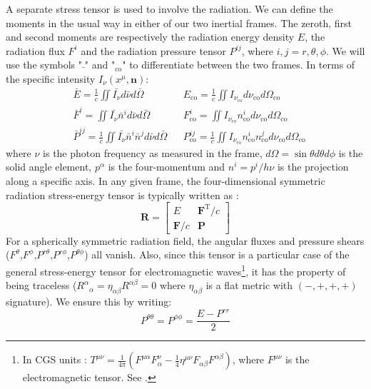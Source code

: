 \documentclass[../main.tex]{subfiles}
\begin{document}
A separate stress tensor is used to involve the radiation. We can define the moments in the usual way in either of our two inertial frames. The zeroth, first and second moments are respectively the radiation energy density $E$, the radiation flux $F^i$ and the radiation pressure tensor $P^{ij}$, where $i,j=r,\theta,\phi$.  We will use the symbols "$\bar{\;}$" and "$_\text{co}$" to differentiate between the two frames.  In terms of the specific intensity $I_\nu(x^\mu,\bm{n})$:
\begin{align}
    &\bar{E}=\frac{1}{c}\iint \bar{I_\nu}d\bar{\nu}d\bar{\Omega}&& E_\text{co}=\frac{1}{c}\iint I_{\nu_\text{co}}d\nu_\text{co}d\Omega_\text{co}\nonumber\\
    &\bar{F}^i=\iint \bar{I_\nu}\bar{n}^id\bar{\nu}d\bar{\Omega}&& F^i_\text{co}=\iint I_{\nu_\text{co}}n^i_\text{co}d\nu_\text{co}d\Omega_\text{co}\nonumber\\
    &\bar{P}^{ij}=\frac{1}{c}\iint \bar{I_\nu}\bar{n}^i\bar{n}^jd\bar{\nu}d\bar{\Omega}&& P^{ij}_\text{co}=\frac{1}{c}\iint I_{\nu_\text{co}}n^i_\text{co}n^j_\text{co}d\nu_\text{co}d\Omega_\text{co}
\end{align}
where $\nu$ is the photon frequency as measured in the frame, $d\Omega=\sin\theta d\theta d\phi$ is the solid angle element, $p^\alpha$ is the four-momentum and $n^i=p^i/h\nu$ is the projection along a specific axis.  In any given frame, the four-dimensional symmetric radiation stress-energy tensor is typically written as \citep{MihalasMihalas1984}:
$$\bm{R}=\begin{bmatrix}E&\bm{F}^\text{T}/c\\\bm{F}/c&\bm{P}\end{bmatrix}$$
For a spherically symmetric radiation field, the angular fluxes and pressure shears ($F^\theta$,$F^\phi$,$P^{r\theta}$,$P^{r\phi}$,$P^{\theta\phi}$) all vanish.  Also, since this tensor is a particular case of the general stress-energy tensor for electromagnetic waves\footnote{In CGS units : $T^{\mu\nu}=
\frac{1}{4\pi}\left(F^{\mu\alpha}F^\nu_\alpha-\frac{1}{4}\eta^{\mu\nu}F_{\alpha\beta}F^{\alpha\beta}\right)$, where $F^{\mu\nu}$ is the electromagnetic tensor.  See \citet{Carroll2004}.}, it has the property of being traceless ($R^\alpha{}_\alpha=\eta_{\alpha\beta}R^{\alpha\beta}=0$ where $\eta_{\alpha\beta}$ is a flat metric with $(-,+,+,+)$ signature).  We ensure this by writing:
$$P^{\theta\theta}=P^{\phi\phi}=\frac{E-P^{rr}}{2}$$
\end{document}
